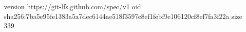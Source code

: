 version https://git-lfs.github.com/spec/v1
oid sha256:7ba5e95fe1383a5a7dec6144ae518f3597c8ef1febf9e106120cf8ef7fa3f22a
size 339
